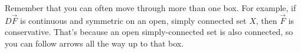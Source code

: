 \documentclass{ximera}
\begin{document}

Remember that you can often move through more than one box.  For example, if $D\vec{F}$ is continuous and symmetric on an open, simply connected set $X$, then $\vec{F}$ is conservative.  That's because an open simply-connected set is also connected, so you can follow arrows all the way up to that box.
\end{document}
